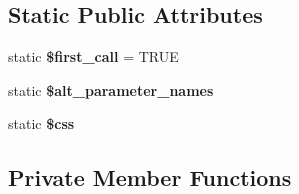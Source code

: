 \subsection*{Static Public Attributes}
\begin{DoxyCompactItemize}
\item 
\mbox{\label{class_dbug_l_a04ee1aab6042607d0db5516909872b56}} 
static {\bfseries \$first\+\_\+call} = T\+R\+UE
\item 
static {\bfseries \$alt\+\_\+parameter\+\_\+names}
\item 
\mbox{\label{class_dbug_l_a5619065f778cf71da2d43cbc4c47a1c4}} 
static {\bfseries \$css}
\end{DoxyCompactItemize}
\subsection*{Private Member Functions}
